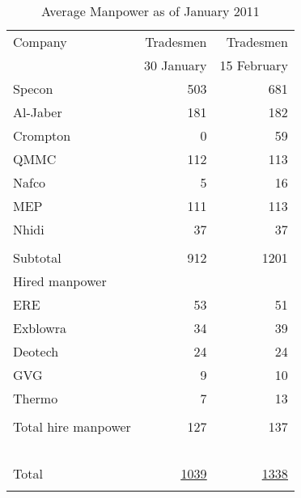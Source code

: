 \def\Z{\phantom{Z}}
\begin{table}[htbp]
\begin{center}
\begin{tabular}{l r r}
\toprule
Company       &Tradesmen & Tradesmen\\
~                 & 30 January & 15 February\\
\midrule
Specon          &503           & 681\\
Al-Jaber         &181           &182\\
Crompton       &   0           &59\\
QMMC            &112          &113\\
Nafco             &5              &16\\
MEP               &111          &113\\
Nhidi              & 37           &37\\
 & \underline{\phantom{1075}}&\underline{\phantom{1075}}\\
Subtotal         &912           &1201\\

Hired manpower      &               &\\
\Z ERE                     &53           &51\\
\Z Exblowra             &34            &39\\
\Z Deotech               &24           &24\\
\Z GVG                    &9             &10\\
\Z Thermo               &7             &13\\
                          & \underline{\phantom{1075}}& \underline{\phantom{1075}}\\
\Z Total hire manpower &127     &137\\
~&&\\
Total                      & \underline{\underline{1039}}       &\underline{\underline{1338}}\\
                             & &\\
\bottomrule
\end{tabular}
\caption{Average Manpower as of January 2011}
\label{tbl:manpower}
\end{center}
\end{table}







